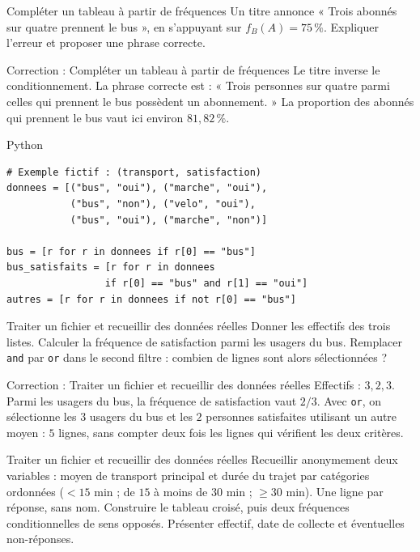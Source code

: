 \documentclass[aspectratio=169,10pt]{beamer}
\begin{document}
\begin{frame}{Compléter un tableau à partir de fréquences}
Un titre annonce « Trois abonnés sur quatre prennent le bus », en s'appuyant sur \(f_B(A)=75\,\%\). Expliquer l'erreur et proposer une phrase correcte.
\end{frame}
\begin{frame}{Correction : Compléter un tableau à partir de fréquences}
Le titre inverse le conditionnement. La phrase correcte est : « Trois personnes sur quatre parmi celles qui prennent le bus possèdent un abonnement. » La proportion des abonnés qui prennent le bus vaut ici environ \(81{,}82\,\%\).
\end{frame}
\begin{frame}[fragile]{Python}
\small
\begin{verbatim}
# Exemple fictif : (transport, satisfaction)
donnees = [("bus", "oui"), ("marche", "oui"),
           ("bus", "non"), ("velo", "oui"),
           ("bus", "oui"), ("marche", "non")]

bus = [r for r in donnees if r[0] == "bus"]
bus_satisfaits = [r for r in donnees
                 if r[0] == "bus" and r[1] == "oui"]
autres = [r for r in donnees if not r[0] == "bus"]
\end{verbatim}
\end{frame}
\begin{frame}{Traiter un fichier et recueillir des données réelles}
Donner les effectifs des trois listes. Calculer la fréquence de satisfaction parmi les usagers du bus. Remplacer \texttt{and} par \texttt{or} dans le second filtre : combien de lignes sont alors sélectionnées ?
\end{frame}
\begin{frame}{Correction : Traiter un fichier et recueillir des données réelles}
Effectifs : \(3,2,3\). Parmi les usagers du bus, la fréquence de satisfaction vaut \(2/3\). Avec \texttt{or}, on sélectionne les \(3\) usagers du bus et les \(2\) personnes satisfaites utilisant un autre moyen : \(5\) lignes, sans compter deux fois les lignes qui vérifient les deux critères.
\end{frame}
\begin{frame}{Traiter un fichier et recueillir des données réelles}
Recueillir anonymement deux variables : moyen de transport principal et durée du trajet par catégories ordonnées (\(<15\) min ; de \(15\) à moins de \(30\) min ; \(\geq30\) min). Une ligne par réponse, sans nom. Construire le tableau croisé, puis deux fréquences conditionnelles de sens opposés. Présenter effectif, date de collecte et éventuelles non-réponses.
\end{frame}
\end{document}
